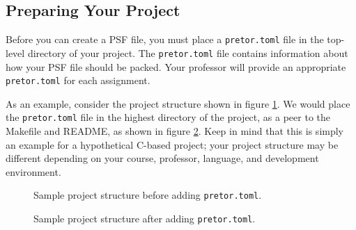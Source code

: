 \documentclass{article}
\begin{document}
\subsection{Preparing Your Project}

Before you can create a PSF file, you must place a \texttt{pretor.toml} file in
the top-level directory of your project. The \texttt{pretor.toml} file contains
information about how your PSF file should be packed. Your professor will
provide an appropriate \texttt{pretor.toml} for each assignment.


As an example, consider the project structure shown in figure \ref{fig:before}.
We would place the \texttt{pretor.toml} file in the highest directory of the
project, as a peer to the Makefile and README, as shown in figure
\ref{fig:after}. Keep in mind that this is simply an example for a hypothetical
C-based project; your project structure may be different depending on your
course, professor, language, and development environment.

\begin{multicols}{2}

	\begin{figure}[H]


		\caption{Sample project structure before adding
		\texttt{pretor.toml}. \label{fig:before}}

	\end{figure}

	\begin{figure}[H]


		\caption{Sample project structure after adding
		\texttt{pretor.toml}. \label{fig:after}}

	\end{figure}

\end{multicols}
\end{document}
